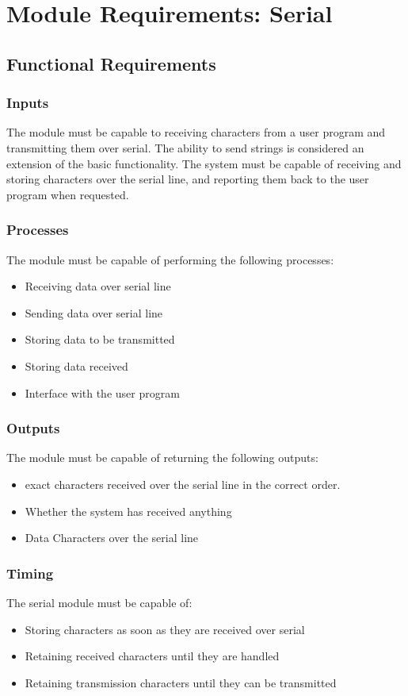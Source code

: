 \documentclass[]{report}
\begin{document}
\section{Module Requirements: Serial}

\subsection{Functional Requirements}
\subsubsection{Inputs}
The module must be capable to receiving characters from a user program and transmitting them over serial. The ability to send strings is considered an extension of the basic functionality. \newline
The system must be capable of receiving and storing characters over the serial line, and reporting them back to the user program when requested.

\subsubsection{Processes}
The module must be capable of performing the following processes:
\begin{itemize}
	\item Receiving data over serial line
	\item Sending data over serial line
	\item Storing data to be transmitted
	\item Storing data received
	\item Interface with the user program
\end{itemize}


\subsubsection{Outputs}
The module must be capable of returning the following outputs:
\begin{itemize}
	\item exact characters received over the serial line in the correct order.
	\item Whether the system has received anything
	\item Data Characters over the serial line
\end{itemize}

\subsubsection{Timing}
The serial module must be capable of:
\begin{itemize}
	\item Storing characters as soon as they are received over serial
	\item Retaining received characters until they are handled
	\item Retaining transmission characters until they can be transmitted
\end{itemize}
\end{document}
